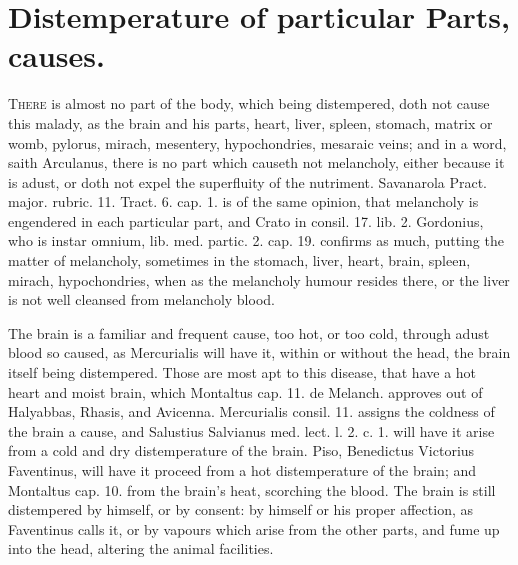 {%
\section{Distemperature of particular Parts, causes.}

\lettrine{T}{here} is almost no part of the body, which being distempered, doth not
cause this malady, as the brain and his parts, heart, liver, spleen,
stomach, matrix or womb, pylorus, mirach, mesentery, hypochondries,
mesaraic veins; and in a word, saith Arculanus, there is no part
which causeth not melancholy, either because it is adust, or doth not
expel the superfluity of the nutriment. Savanarola Pract. major.
rubric. 11. Tract. 6. cap. 1. is of the same opinion, that melancholy
is engendered in each particular part, and Crato in consil. 17.
lib. 2. Gordonius, who is instar omnium, lib. med. partic. 2. cap. 19.
confirms as much, putting the matter of melancholy, sometimes in
the stomach, liver, heart, brain, spleen, mirach, hypochondries, when
as the melancholy humour resides there, or the liver is not well
cleansed from melancholy blood.

The brain is a familiar and frequent cause, too hot, or too cold,
 through adust blood so caused, as Mercurialis will have it,
within or without the head, the brain itself being distempered. Those
are most apt to this disease, that have a hot heart and moist
brain, which Montaltus cap. 11. de Melanch. approves out of Halyabbas,
Rhasis, and Avicenna. Mercurialis consil. 11. assigns the coldness of
the brain a cause, and Salustius Salvianus med. lect. l. 2. c. 1.
will have it arise from a cold and dry distemperature of the
brain. Piso, Benedictus Victorius Faventinus, will have it proceed from
a hot distemperature of the brain; and Montaltus cap. 10.
from the brain's heat, scorching the blood. The brain is still
distempered by himself, or by consent: by himself or his proper
affection, as Faventinus calls it, or by vapours which arise from
the other parts, and fume up into the head, altering the animal
facilities.

}

